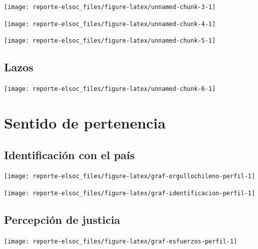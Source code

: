 \documentclass[
  12pt,
]{book}
\begin{document}
\begin{center}\texttt{[image: reporte-elsoc\_files/figure-latex/unnamed-chunk-3-1]} \end{center}

\begin{center}\texttt{[image: reporte-elsoc\_files/figure-latex/unnamed-chunk-4-1]} \end{center}

\begin{center}\texttt{[image: reporte-elsoc\_files/figure-latex/unnamed-chunk-5-1]} \end{center}

\hypertarget{lazos}{%
\subsection{Lazos}\label{lazos}}

\begin{center}\texttt{[image: reporte-elsoc\_files/figure-latex/unnamed-chunk-6-1]} \end{center}

\hypertarget{sentido-de-pertenencia}{%
\section{Sentido de pertenencia}\label{sentido-de-pertenencia}}

\hypertarget{identificaciuxf3n-con-el-pauxeds}{%
\subsection{Identificación con el país}\label{identificaciuxf3n-con-el-pauxeds}}

\begin{center}\texttt{[image: reporte-elsoc\_files/figure-latex/graf-orgullochileno-perfil-1]} \end{center}

\begin{center}\texttt{[image: reporte-elsoc\_files/figure-latex/graf-identificacion-perfil-1]} \end{center}

\hypertarget{percepciuxf3n-de-justicia}{%
\subsection{Percepción de justicia}\label{percepciuxf3n-de-justicia}}

\begin{center}\texttt{[image: reporte-elsoc\_files/figure-latex/graf-esfuerzos-perfil-1]} \end{center}
\end{document}

